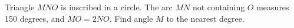 Triangle $MNO$ is inscribed in a circle. The arc $MN$ not containing $O$ measures 150 degrees, and $MO=2NO$. Find angle $M$ to the nearest degree.
